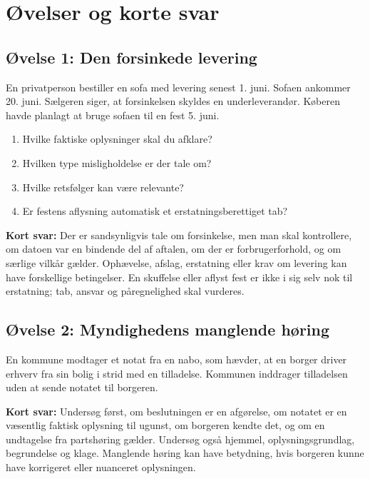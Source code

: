 \chapter{Øvelser og korte svar}


\section{Øvelse 1: Den forsinkede levering}

En privatperson bestiller en sofa med levering senest 1. juni. Sofaen ankommer 20. juni. Sælgeren siger, at forsinkelsen skyldes en underleverandør. Køberen havde planlagt at bruge sofaen til en fest 5. juni.

\begin{enumerate}
  \item Hvilke faktiske oplysninger skal du afklare?
  \item Hvilken type misligholdelse er der tale om?
  \item Hvilke retsfølger kan være relevante?
  \item Er festens aflysning automatisk et erstatningsberettiget tab?
\end{enumerate}

\textbf{Kort svar:} Der er sandsynligvis tale om forsinkelse, men man skal kontrollere, om datoen var en bindende del af aftalen, om der er forbrugerforhold, og om særlige vilkår gælder. Ophævelse, afslag, erstatning eller krav om levering kan have forskellige betingelser. En skuffelse eller aflyst fest er ikke i sig selv nok til erstatning; tab, ansvar og påregnelighed skal vurderes.

\section{Øvelse 2: Myndighedens manglende høring}

En kommune modtager et notat fra en nabo, som hævder, at en borger driver erhverv fra sin bolig i strid med en tilladelse. Kommunen inddrager tilladelsen uden at sende notatet til borgeren.

\textbf{Kort svar:} Undersøg først, om beslutningen er en afgørelse, om notatet er en væsentlig faktisk oplysning til ugunst, om borgeren kendte det, og om en undtagelse fra partshøring gælder. Undersøg også hjemmel, oplysningsgrundlag, begrundelse og klage. Manglende høring kan have betydning, hvis borgeren kunne have korrigeret eller nuanceret oplysningen.

